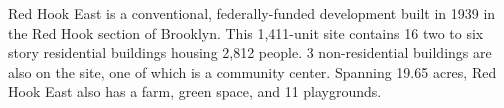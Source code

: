  

Red Hook East is a conventional, federally-funded development built in 1939 in the Red Hook section of Brooklyn. This 1,411-unit site contains 16 two to six story residential buildings housing 2,812 people. 3 non-residential buildings are also on the site, one of which is a community center. Spanning 19.65 acres, Red Hook East also has a farm, green space, and 11 playgrounds.  